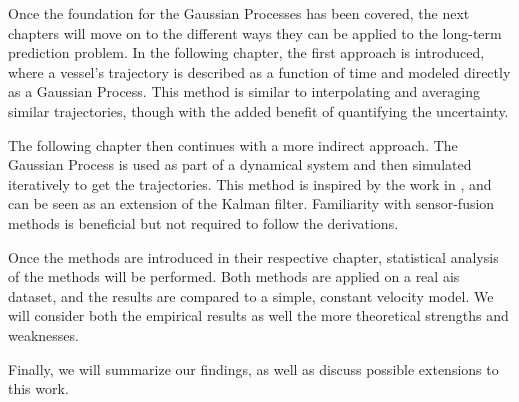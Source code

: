 Once the foundation for the Gaussian Processes has been covered, the next chapters will move on to the different ways they can be applied to the long-term prediction problem. In the following chapter, the first approach is introduced, where a vessel's trajectory is described as a function of time and modeled directly as a Gaussian Process. This method is similar to interpolating and averaging similar trajectories, though with the added benefit of quantifying the uncertainty.

The following chapter then continues with a more indirect approach. The Gaussian Process is used as part of a dynamical system and then simulated iteratively to get the trajectories. This method is inspired by the work in \cite{pedestrian,gpekf}, and can be seen as an extension of the Kalman filter. Familiarity with sensor-fusion methods is beneficial but not required to follow the derivations.

Once the methods are introduced in their respective chapter, statistical analysis of the methods will be performed. Both methods are applied on a real \acrshort{ais} dataset, and the results are compared to a simple, constant velocity model.  We will consider both the empirical results as well the more theoretical strengths and weaknesses. 

Finally, we will summarize our findings, as well as discuss possible extensions to this work.



